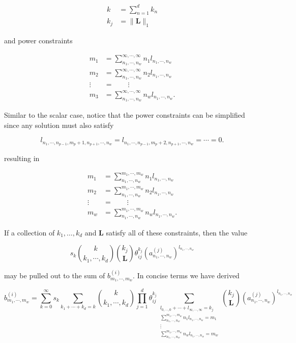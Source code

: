 \begin{align}
    k &= \sum_{n=1}^{d} k_n \\
    k_j &= \lVert \mathbf{L} \rVert_1
\end{align}

and power constraints

\begin{align}
    m_1 &= \sum_{n_1, \cdots, n_w}^{\infty, \cdots, \infty} n_1 l_{n_1, \cdots, n_w} \nonumber \\
    m_2 &= \sum_{n_1, \cdots, n_w}^{\infty, \cdots, \infty} n_2 l_{n_1, \cdots, n_w} \nonumber \\
    \vdots \;\; &= \qquad \vdots \nonumber \\
    m_3 &= \sum_{n_1, \cdots, n_w}^{\infty, \cdots, \infty} n_w l_{n_1, \cdots, n_w}.
\end{align}

Similar to the scalar case, notice that the power constraints can be simplified since any solution must also satisfy

\begin{equation}
    l_{n_1, \cdots, n_{p-1}, m_p + 1, n_{p+1}, \cdots, n_w} = l_{n_1, \cdots, n_{p-1}, m_p + 2, n_{p+1}, \cdots, n_w} = \cdots = 0.
\end{equation}

resulting in

\begin{align}
    m_1 &= \sum_{n_1, \cdots, n_w}^{m_1, \cdots, m_w} n_1 l_{n_1, \cdots, n_w} \nonumber \\
    m_2 &= \sum_{n_1, \cdots, n_w}^{m_1, \cdots, m_w} n_2 l_{n_1, \cdots, n_w} \nonumber \\
    \vdots \;\; &= \qquad \vdots \nonumber \\
    m_w &= \sum_{n_1, \cdots, n_w}^{m_1, \cdots, m_w} n_w l_{n_1, \cdots, n_w}.
\end{align}

If a collection of $k_1, \ldots, k_d$ and $\mathbf{L}$ satisfy all of these constraints, then the value

\begin{equation*}
    s_k \binom{k}{k_1, \cdots, k_d} \binom{k_j}{\mathbf{L}} \theta_{ij}^{k_j} (a^{(j)}_{n_1, \cdots, n_w})^{l_{n_1, \cdots, n_w}}
\end{equation*}

may be pulled out to the sum of $b^{(i)}_{m_1, \cdots, m_w}$. In concise terms we have derived

\begin{equation}
    b^{(i)}_{m_1, \cdots, m_w} = \sum_{k=0}^{\infty} s_k \sum_{k_1 + \cdots + k_d = k} \binom{k}{k_1, \cdots, k_d} \prod_{j=1}^{d} \theta_{ij}^{k_j} \sum_{\substack{l_{0, \cdots, 0} + \cdots + l_{\infty, \cdots, \infty} = k_j \\ \sum_{n_1, \cdots, n_w}^{m_1, \cdots, m_w} n_1 l_{n_1, \cdots, n_w} = m_1 \\ \vdots \\ \sum_{n_1, \cdots, n_w}^{m_1, \cdots, m_w} n_w l_{n_1, \cdots, n_w} = m_w}} \binom{k_j}{\mathbf{L}} (a^{(j)}_{n_1, \cdots, n_w})^{l_{n_1, \cdots, n_w}}
\end{equation}

